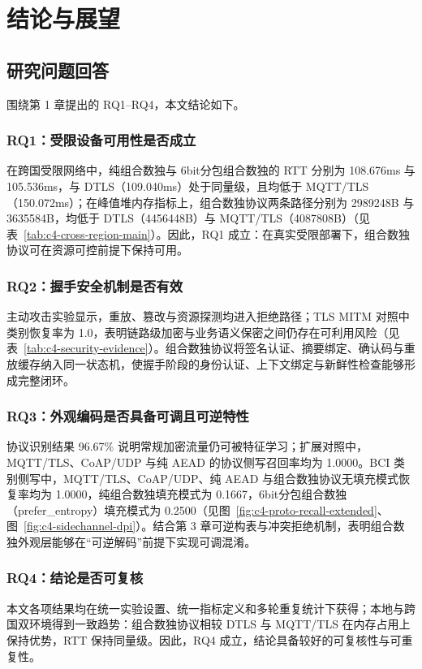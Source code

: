 \chapter{结论与展望}

\section{研究问题回答}
围绕第 1 章提出的 RQ1--RQ4，本文结论如下。

\subsection{RQ1：受限设备可用性是否成立}
在跨国受限网络中，纯组合数独与 6bit分包组合数独的 RTT 分别为 108.676ms 与 105.536ms，与 DTLS（109.040ms）处于同量级，且均低于 MQTT/TLS（150.072ms）；在峰值堆内存指标上，组合数独协议两条路径分别为 2989248B 与 3635584B，均低于 DTLS（4456448B）与 MQTT/TLS（4087808B）（见表~\ref{tab:c4-cross-region-main}）。因此，RQ1 成立：在真实受限部署下，组合数独协议可在资源可控前提下保持可用\cite{restuccia2020lowpower,nedergaard2023coapsecure,gavriilidis2025mqtttls}。

\subsection{RQ2：握手安全机制是否有效}
主动攻击实验显示，重放、篡改与资源探测均进入拒绝路径；TLS MITM 对照中类别恢复率为 1.0，表明链路级加密与业务语义保密之间仍存在可利用风险（见表~\ref{tab:c4-security-evidence}）。组合数独协议将签名认证、摘要绑定、确认码与重放缓存纳入同一状态机，使握手阶段的身份认证、上下文绑定与新鲜性检查能够形成完整闭环\cite{rfc8446,rfc9147,wilkens2021passivetls}。

\subsection{RQ3：外观编码是否具备可调且可逆特性}
协议识别结果 96.67\% 说明常规加密流量仍可被特征学习；扩展对照中，MQTT/TLS、CoAP/UDP 与纯 AEAD 的协议侧写召回率均为 1.0000。BCI 类别侧写中，MQTT/TLS、CoAP/UDP、纯 AEAD 与组合数独协议无填充模式恢复率均为 1.0000，纯组合数独填充模式为 0.1667，6bit分包组合数独（prefer\_entropy）填充模式为 0.2500（见图~\ref{fig:c4-proto-recall-extended}、图~\ref{fig:c4-sidechannel-dpi}）。结合第 3 章可逆构表与冲突拒绝机制，表明组合数独外观层能够在“可逆解码”前提下实现可调混淆\cite{alwhbi2024encrypted,hou2024encmalware}。

\subsection{RQ4：结论是否可复核}
本文各项结果均在统一实验设置、统一指标定义和多轮重复统计下获得；本地与跨国双环境得到一致趋势：组合数独协议相较 DTLS 与 MQTT/TLS 在内存占用上保持优势，RTT 保持同量级。因此，RQ4 成立，结论具备较好的可复核性与可重复性。

